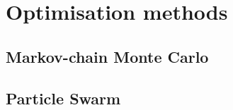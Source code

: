 \section{Optimisation methods}
\label{sec:optimisation}

\subsection{Markov-chain Monte Carlo}

\subsection{Particle Swarm}
